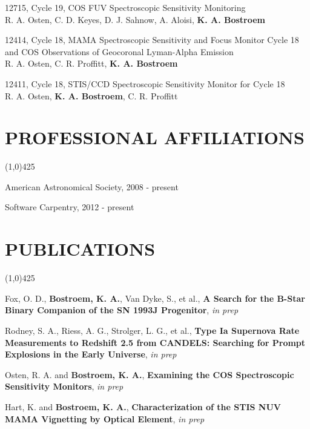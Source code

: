 \documentclass{res}
\begin{document}
\begin{resume}
12715, Cycle 19, COS FUV Spectroscopic Sensitivity Monitoring \\
R. A. Osten, C. D. Keyes, D. J. Sahnow, A. Aloisi, {\bf K. A. Bostroem}

12414, Cycle 18, MAMA Spectroscopic Sensitivity and Focus Monitor Cycle 18 and COS Observations of Geocoronal Lyman-Alpha Emission \\
R. A. Osten, C. R. Proffitt, {\bf K. A. Bostroem}

12411, Cycle 18, STIS/CCD Spectroscopic Sensitivity Monitor for Cycle 18 \\
R. A. Osten, {\bf K. A. Bostroem}, C. R. Proffitt



\section{PROFESSIONAL AFFILIATIONS}
\vspace{-.2in} 
\begin{center}
\line(1,0){425}
\end{center}
\vspace{-.3in}  
\vspace{0.1in} 
    American Astronomical Society, 2008 - present

    Software Carpentry, 2012 - present
    
\section{PUBLICATIONS}
\vspace{-.2in} 
\begin{center}
\line(1,0){425}
\end{center}
\vspace{-.25in} 
\vspace{0.1in}


Fox, O. D., {\bf Bostroem, K. A.}, Van Dyke, S., et al., {\bf A Search for the B-Star Binary Companion
of the SN 1993J Progenitor}, \emph{in prep}

Rodney, S. A., Riess, A. G., Strolger, L. G., et al., {\bf Type Ia Supernova Rate Measurements to Redshift 2.5 from CANDELS: Searching for Prompt Explosions in the Early Universe}, \emph{in prep}

Osten, R. A. and {\bf Bostroem, K. A.}, {\bf Examining the COS Spectroscopic Sensitivity Monitors}, \emph{in prep}

Hart, K. and {\bf Bostroem, K. A.}, {\bf Characterization of the STIS NUV MAMA Vignetting by Optical Element}, \emph{in prep}


\end{resume}
\end{document}
